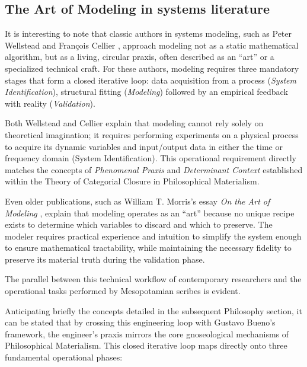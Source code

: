 \documentclass[11pt, a4paper]{article}
\begin{document}
\subsection{The Art of Modeling in systems literature}

It is interesting to note that classic authors in systems modeling, such as Peter Wellstead \cite{Wellstead79} and François Cellier \cite{cellier1991continuous}, approach modeling not as a static mathematical algorithm, but as a living, circular praxis, often described as an ``art'' or a specialized technical craft. For these authors, modeling requires three mandatory stages that form a closed iterative loop: data acquisition from a process (\textit{System Identification}), structural fitting (\textit{Modeling}) followed by an empirical feedback with reality (\textit{Validation}).

Both Wellstead and Cellier explain that modeling cannot rely solely on theoretical imagination; it requires performing experiments on a physical process to acquire its dynamic variables and input/output data in either the time or frequency domain (System Identification). This operational requirement directly matches the concepts of \textit{Phenomenal Praxis} and \textit{Determinant Context} established within the Theory of Categorial Closure in Philosophical Materialism.

Even older publications, such as William T. Morris's essay \textit{On the Art of Modeling} \cite{morris1967art}, explain that modeling operates as an ``art'' because no unique recipe exists to determine which variables to discard and which to preserve. The modeler requires practical experience and intuition to simplify the system enough to ensure mathematical tractability, while maintaining the necessary fidelity to preserve its material truth during the validation phase.

The parallel between this technical workflow of contemporary researchers and the operational tasks performed by Mesopotamian scribes is evident.



Anticipating briefly the concepts detailed in the subsequent Philosophy section, it can be stated that by crossing this engineering loop with Gustavo Bueno's framework, the engineer's praxis mirrors the core gnoseological mechanisms of Philosophical Materialism. This closed iterative loop maps directly onto three fundamental operational phases:
\end{document}
